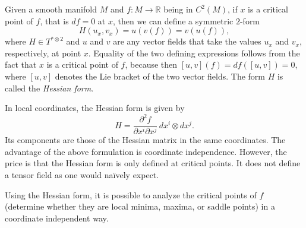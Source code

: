 \documentclass[12pt]{article}
\def\R{\mathbb{R}}
\def\del{\partial}
\begin{document}
Given a smooth manifold $M$ and $f\colon M\to \R$ being in $C^2(M)$, if $x$ is a critical point of $f$, that is $df = 0$ at $x$, then we can define a symmetric $2$-form
\[
  H(u_x,v_x) = u(v(f)) = v(u(f)),
\]
where $H\in T^{*\otimes2}$ and $u$ and $v$ are any vector fields that take the values $u_x$ and $v_x$, respectively, at point $x$. Equality of the two defining expressions follows from the fact that $x$ is a critical point of $f$, because then $[u,v](f) = df([u,v]) = 0$, where $[u,v]$ denotes the Lie bracket of the two vector fields. The form $H$ is called the \emph{Hessian form}.

In local coordinates, the Hessian form is given by 
\[
  H = \frac{\del^2 f}{\del x^i \del x^j}\, dx^i\otimes dx^j.
\]
Its components are those of the Hessian matrix in the same coordinates. The advantage of the above formulation is coordinate independence. However, the price is that the Hessian form is only defined at critical points. It does not define a tensor field as one would na\"ively expect.

Using the Hessian form, it is possible to analyze the critical points of $f$ (determine whether they are local minima, maxima, or saddle points) in a coordinate independent way.
\end{document}
